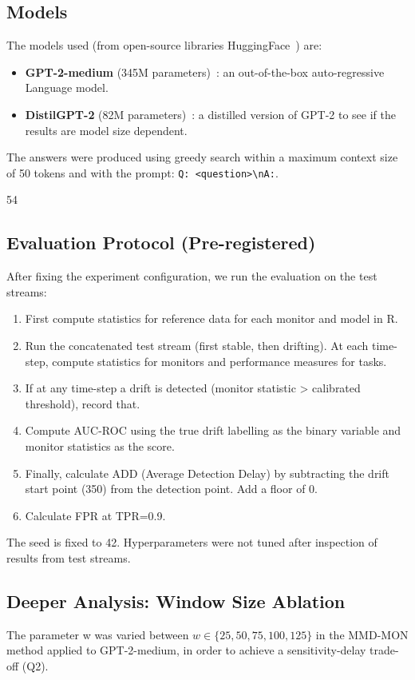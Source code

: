 \documentclass[12pt,a4paper]{article}
\begin{document}
\subsection{Models}
The models used (from open-source libraries HuggingFace~\cite{Wolf2020}) are:
\begin{itemize}
  \item \textbf{GPT-2-medium} (345M parameters)~\cite{Radford2019}: an out-of-the-box auto-regressive Language model.
  \item \textbf{DistilGPT-2} (82M parameters)~\cite{Sanh2019}: a distilled version of GPT-2 to see if the results are model size dependent.
\end{itemize}
The answers were produced using greedy search within a maximum context size of 50 tokens and with the prompt: \texttt{Q: <question>\textbackslash nA:}.


 54    

\subsection{Evaluation Protocol (Pre-registered)}
After fixing the experiment configuration, we run the evaluation on the test streams:
\begin{enumerate}
  \item First compute statistics for reference data for each monitor and model in R. 
  \item Run the concatenated test stream (first stable, then drifting). At each time-step,        compute statistics for monitors and performance measures for tasks.
  \item If at any time-step a drift is detected (monitor statistic > calibrated threshold),       record that.
  \item Compute AUC-ROC using the true drift labelling as the binary variable and monitor         statistics as the score.
  \item Finally, calculate ADD (Average Detection Delay) by subtracting the drift start           point (350) from the detection point. Add a floor of 0.
  \item Calculate FPR at TPR=0.9.
\end{enumerate}
The seed is fixed to 42. Hyperparameters were not tuned after inspection of results from test streams.
 
\subsection{Deeper Analysis: Window Size Ablation}
The parameter w was varied between $w\in\{25,50,75,100,125\}$ in the MMD-MON method applied to GPT-2-medium, in order to achieve a sensitivity-delay trade-off (Q2).
\end{document}
